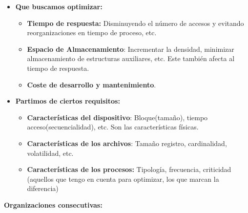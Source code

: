 \documentclass[12pt, twoside, openright]{report} %
\begin{document}
  \begin{itemize}
  \item \textbf{Que buscamos optimizar:}
    

    \begin{itemize}
    \item \textbf{Tiempo de respuesta:} Disminuyendo el número de accesos y
      evitando reorganizaciones en tiempo de proceso, etc.
      
    \item \textbf{Espacio de Almacenamiento}: Incrementar la densidad,
      minimizar almacenamiento de estructuras auxiliares, etc. Este
      también afecta al tiempo de respuesta.
      
    \item \textbf{Coste de desarrollo y mantenimiento}.
      
    \end{itemize}
  \item \textbf{Partimos de ciertos requisitos:}
    

    \begin{itemize}
    \item \textbf{Características del dispositivo}: Bloque(tamaño), tiempo
      acceso(secuencialidad), etc. Son las características físicas.
      
    \item \textbf{Características de los archivos}: Tamaño registro,
      cardinalidad, volatilidad, etc.
      
    \item \textbf{Características de los procesos:} Tipología, frecuencia,
      criticidad (aquellos que tengo en cuenta para optimizar, los que
      marcan la diferencia)
      
    \end{itemize}
  \end{itemize}

  
  \textbf{Organizaciones consecutivas:}
  
\end{document}
